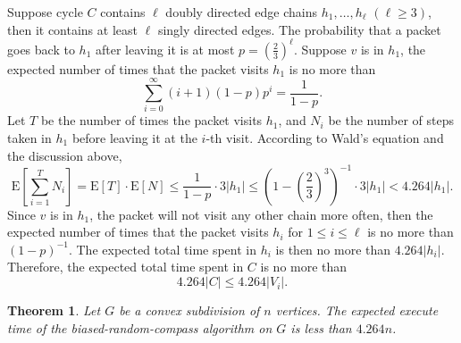 \documentclass [letterpaper] {article}
\newtheorem{theorem}{Theorem}%
\begin{document}
Suppose cycle $C$ contains $\ell$ doubly directed edge chains $h_{1}, \ldots, h_{\ell}$ $(\ell \geq 3)$, then it contains at least $\ell$ singly directed edges. The probability that a packet goes back to $h_{1}$ after leaving it is at most $p = \left(\frac{2}{3}\right)^{\ell}$. Suppose $v$ is in $h_{1}$, the expected number of times that the packet visits $h_{1}$ is no more than
\[\sum_{i=0}^{\infty}(i+1)(1-p)p^{i} = \frac{1}{1-p}.\]
Let $T$ be the number of times the packet visits $h_{1}$, and $N_{i}$ be the number of steps taken in $h_{1}$ before leaving it at the $i$-th visit. According to Wald's equation and the discussion above,
\[\mathrm{E}\left[ \sum_{i=1}^{T}N_{i} \right] = \mathrm{E}[T] \cdot \mathrm{E}[N] \leq \frac{1}{1-p} \cdot 3|h_{1}| \leq \left( 1 - \left(\frac{2}{3}\right)^{3} \right)^{-1} \cdot 3|h_{1}| < 4.264|h_{1}|.\]
Since $v$ is in $h_{1}$, the packet will not visit any other chain more often, then the expected number of times that the packet visits $h_{i}$ for $1 \leq i \leq \ell$ is no more than $(1-p)^{-1}$. The expected total time spent in $h_{i}$ is then no more than $4.264|h_{i}|$. Therefore, the expected total time spent in $C$ is no more than
\[ 4.264|C| \leq 4.264|V_{i}|. \]


\begin{theorem}
\label{thm:timecomp}
  Let $G$ be a convex subdivision of $n$ vertices. The expected execute time of the {\sc biased-random-compass} algorithm on $G$ is less than $4.264n$.
\end{theorem}




\end{document}
